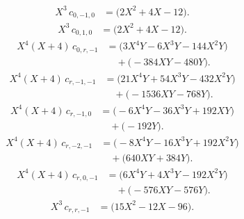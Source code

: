 \begin{equation}
\begin{aligned}
X^{3}\,c_{0,-1,0}&={}\bigl(2 X^{2} + 4 X - 12\bigr).
\end{aligned}
\end{equation}
\begin{equation}
\begin{aligned}
X^{3}\,c_{0,1,0}&={}\bigl(2 X^{2} + 4 X - 12\bigr).
\end{aligned}
\end{equation}
\begin{equation}
\begin{aligned}
X^{4} \left(X + 4\right)\,c_{0,r,-1}&={}\bigl(3 X^{4} Y - 6 X^{3} Y - 144 X^{2} Y\bigr)\\
&\quad{}+\bigl(- 384 X Y - 480 Y\bigr).
\end{aligned}
\end{equation}
\begin{equation}
\begin{aligned}
X^{4} \left(X + 4\right)\,c_{r,-1,-1}&={}\bigl(21 X^{4} Y + 54 X^{3} Y - 432 X^{2} Y\bigr)\\
&\quad{}+\bigl(- 1536 X Y - 768 Y\bigr).
\end{aligned}
\end{equation}
\begin{equation}
\begin{aligned}
X^{4} \left(X + 4\right)\,c_{r,-1,0}&={}\bigl(- 6 X^{4} Y - 36 X^{3} Y + 192 X Y\bigr)\\
&\quad{}+\bigl(- 192 Y\bigr).
\end{aligned}
\end{equation}
\begin{equation}
\begin{aligned}
X^{4} \left(X + 4\right)\,c_{r,-2,-1}&={}\bigl(- 8 X^{4} Y - 16 X^{3} Y + 192 X^{2} Y\bigr)\\
&\quad{}+\bigl(640 X Y + 384 Y\bigr).
\end{aligned}
\end{equation}
\begin{equation}
\begin{aligned}
X^{4} \left(X + 4\right)\,c_{r,0,-1}&={}\bigl(6 X^{4} Y + 4 X^{3} Y - 192 X^{2} Y\bigr)\\
&\quad{}+\bigl(- 576 X Y - 576 Y\bigr).
\end{aligned}
\end{equation}
\begin{equation}
\begin{aligned}
X^{3}\,c_{r,r,-1}&={}\bigl(15 X^{2} - 12 X - 96\bigr).
\end{aligned}
\end{equation}
